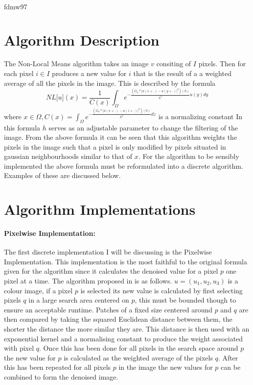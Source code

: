 \documentclass[11pt,letterpaper]{article}
\begin{document}
\vspace*{0.2in}

\begin{flushleft}
{\Large
\textbf{}
}
\newline

\\
fdmw97
\\
\bigskip

\end{flushleft}

\section*{Algorithm Description}
The Non-Local Means algorithm takes an image $v$ consiting of $I$ pixels. Then for each pixel $i \in I$ produces a new value for $i$ that is the result of a a weighted average of all the pixels in the image. This is described by the formula
$$\mathit{NL}[\mathit{u](x)} = \frac{1}{\mathit{C(x)}}\int_{\Omega}^{}\mathit{e^{-\frac{(G_{a}*|u(x+.)-u(y+.)|^{2})(0)}{h^{2}}u(y) dy}}$$
where $\mathit{x \in \Omega, C(x) = \int_{\Omega}^{}e^{-\frac{(G_{a}*|u(x+.)-u(z+.)|^{2})(0)}{h^{2}}dz}}$ is a normalizing constant\cite{paper1}
In this formula $h$ serves as an adjustable parameter to change the filtering of the image. From the above formula it can be seen that this algorithm weights the pixels in the image such that a pixel is only modified by pixels situated in gaussian neighbourhoods similar to that of $x$.
For the algorithm to be sensibly implemented the above formula must be reformulated into a discrete algorithm. Examples of these are discussed below.

\section*{Algorithm Implementations}
\paragraph{Pixelwise Implementation:}
The first discrete implementation I will be discussing is the Pixelwise Implementation. This implementation is the most faithful to the original formula given for the algorithm since it calculates the denoised value for a pixel $p$ one pixel at a time. The algorithm proposed in \cite{paper2} is as follows.
$u = (u_{1}, u_{2}, u_{3})$ is a colour image, if a pixel $p$ is selected its new value is calculated by first selecting pixels $q$ in a large search area centered on $p$, this must be bounded though to ensure an acceptable runtime. Patches of a fixed size centered around $p$ and $q$ are then compared by taking the squared Euclidean distance between them, the shorter the distance the more similar they are. This distance is then used with an exponential kernel and a normalising constant to produce the weight associated with pixel $q$. Once this has been done for all pixels in the search space around $p$ the new value for $p$ is calculated as the weighted average of the pixels $q$. After this has been repeated for all pixels $p$ in the image the new values for $p$ can be combined to form the denoised image.
\end{document}
